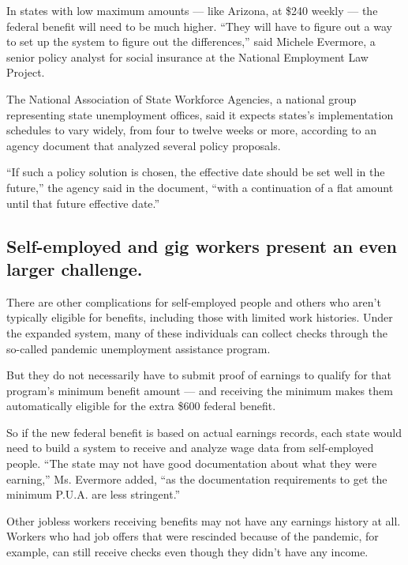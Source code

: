 In states with low maximum amounts --- like Arizona, at \$240 weekly ---
the federal benefit will need to be much higher. ``They will have to
figure out a way to set up the system to figure out the differences,''
said Michele Evermore, a senior policy analyst for social insurance at
the National Employment Law Project.

The National Association of State Workforce Agencies, a national group
representing state unemployment offices, said it expects states's
implementation schedules to vary widely, from four to twelve weeks or
more, according to an agency document that analyzed several policy
proposals.

``If such a policy solution is chosen, the effective date should be set
well in the future,'' the agency said in the document, ``with a
continuation of a flat amount until that future effective date.''

\hypertarget{self-employed-and-gig-workers-present-an-even-larger-challenge}{%
\subsection{Self-employed and gig workers present an even larger
challenge.}\label{self-employed-and-gig-workers-present-an-even-larger-challenge}}

There are other complications for self-employed people and others who
aren't typically eligible for benefits, including those with limited
work histories. Under the expanded system, many of these individuals can
collect checks through the so-called pandemic unemployment assistance
program.

But they do not necessarily have to submit proof of earnings to qualify
for that program's minimum benefit amount --- and receiving the minimum
makes them automatically eligible for the extra \$600 federal benefit.

So if the new federal benefit is based on actual earnings records, each
state would need to build a system to receive and analyze wage data from
self-employed people. ``The state may not have good documentation about
what they were earning,'' Ms. Evermore added, ``as the documentation
requirements to get the minimum P.U.A. are less stringent.''

Other jobless workers receiving benefits may not have any earnings
history at all. Workers who had job offers that were rescinded because
of the pandemic, for example, can still receive checks even though they
didn't have any income.

